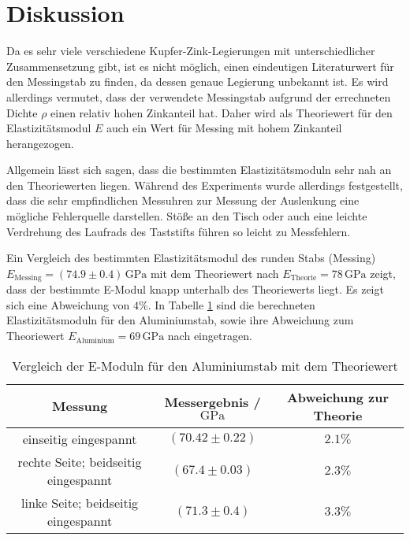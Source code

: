 \section{Diskussion}
\label{sec:Diskussion}
Da es sehr viele verschiedene Kupfer-Zink-Legierungen mit unterschiedlicher Zusammensetzung gibt, ist es nicht möglich, einen eindeutigen Literaturwert für den Messingstab zu finden, da dessen genaue Legierung unbekannt ist.
Es wird allerdings vermutet, dass der verwendete Messingstab aufgrund der errechneten Dichte $\rho$ einen relativ hohen Zinkanteil hat.
Daher wird als Theoriewert für den Elastizitätsmodul $E$ auch ein Wert für Messing mit hohem Zinkanteil herangezogen.

Allgemein lässt sich sagen, dass die bestimmten Elastizitätsmoduln sehr nah an den Theoriewerten liegen.
Während des Experiments wurde allerdings festgestellt, dass die sehr empfindlichen Messuhren zur Messung der Auslenkung eine mögliche Fehlerquelle darstellen.
Stöße an den Tisch oder auch eine leichte Verdrehung des Laufrads des Taststifts führen so leicht zu Messfehlern.

Ein Vergleich des bestimmten Elastizitätsmodul des runden Stabs (Messing) $E_{\mathrm{Messing}}= (74.9 \pm 0.4)\,\si{\giga\pascal}$ mit dem Theoriewert nach \cite{Hans}
$E_{\mathrm{Theorie}}=78\, \si{\giga\pascal}$ zeigt, dass der bestimmte E-Modul knapp unterhalb des Theoriewerts liegt. Es zeigt sich eine Abweichung von $4\%$.
In Tabelle \ref{tab:messergebnisse} sind die berechneten Elastizitätsmoduln für den Aluminiumstab, sowie ihre Abweichung zum Theoriewert $E_{\mathrm{Aluminium}}= 69\, \si{\giga\pascal}$ nach \cite{Hans} eingetragen.

\begin{table}
	\centering
	\caption{Vergleich der E-Moduln für den Aluminiumstab mit dem Theoriewert}
	\label{tab:messergebnisse}
	\begin{tabular}{ccc}
		\toprule
		Messung                              & Messergebnis /$\si{\giga\pascal}$ & Abweichung zur Theorie \\
		\midrule
		einseitig eingespannt                & $(70.42 \pm 0.22)$                & $2.1\%$                \\
		rechte Seite; beidseitig eingespannt & $(67.4 \pm 0.03)$                 & $2.3\%$                \\
		linke Seite; beidseitig eingespannt  & $(71.3 \pm 0.4)$                  & $3.3\%$                \\
		\bottomrule
	\end{tabular}
\end{table}
